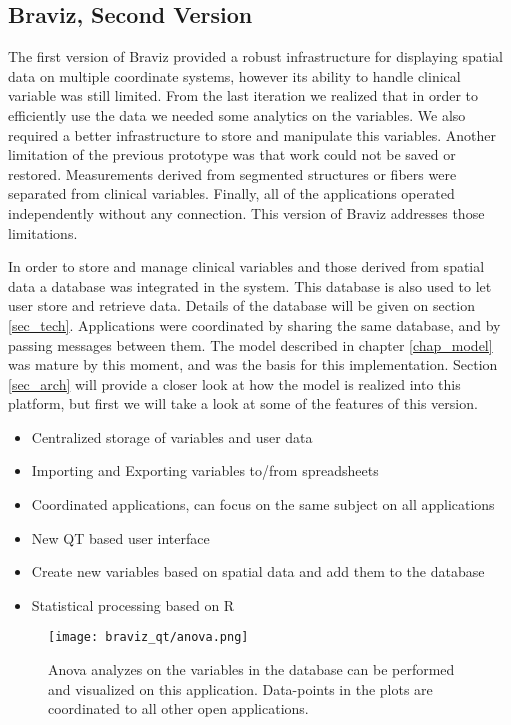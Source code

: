 
\subsection{Braviz, Second Version}


The first version of Braviz provided a robust infrastructure for displaying spatial data on multiple coordinate systems, however its ability to handle clinical variable was still limited. From the last iteration we realized that in order to efficiently use the data we needed some analytics on the variables. We also required a better infrastructure to store and manipulate this variables. Another limitation of the previous prototype was that work could not be saved or restored. Measurements derived from segmented structures or fibers were separated from clinical variables. Finally, all of the applications operated independently without any connection. This version of Braviz addresses those limitations. 

In order to store and manage clinical variables and those derived from spatial data a database was integrated in the system. This database is also used to let user store and retrieve data. Details of the database will be given on section \ref{sec_tech}. Applications were coordinated by sharing the same database, and by passing messages between them. The model described in chapter \ref{chap_model} was mature by this moment, and was the basis for this implementation. Section \ref{sec_arch} will provide a closer look at how the model is realized into this platform, but first we will take a look at some of the features of this version.

\begin{itemize}
	\item Centralized storage of variables and user data
	\item Importing and Exporting variables to/from spreadsheets
	\item Coordinated applications, can focus on the same subject on all applications
	\item New QT based user interface
	\item Create new variables based on spatial data and add them to the database
	\item Statistical processing based on R
\end{itemize}

\begin{figure}
\centering
\texttt{[image: braviz\_qt/anova.png]} 
\caption{\label{fig_anova_1}Anova analyzes on the variables in the database can be performed and visualized on this application. Data-points in the plots are coordinated to all other open applications.}
\end{figure}

